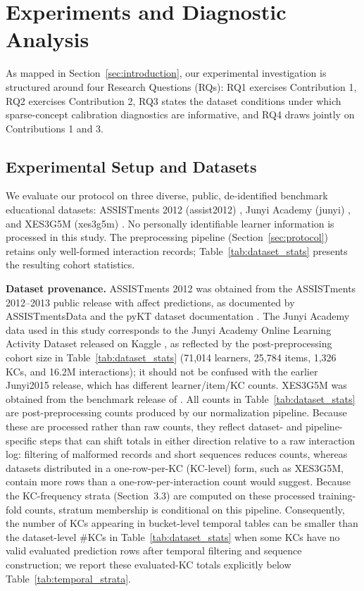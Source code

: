 \section{Experiments and Diagnostic Analysis}
\label{sec:experiments}

As mapped in Section~\ref{sec:introduction}, our experimental investigation is structured around four Research Questions (RQs): RQ1 exercises Contribution 1, RQ2 exercises Contribution 2, RQ3 states the dataset conditions under which sparse-concept calibration diagnostics are informative, and RQ4 draws jointly on Contributions 1 and 3.

\subsection{Experimental Setup and Datasets}
We evaluate our protocol on three diverse, public, de-identified benchmark educational datasets: ASSISTments 2012 (assist2012) \citep{assistments2012data,liu2022pykt}, Junyi Academy (junyi) \citep{junyi2019kaggle}, and XES3G5M (xes3g5m) \citep{liu2023xes3g5m}. No personally identifiable learner information is processed in this study. The preprocessing pipeline (Section~\ref{sec:protocol}) retains only well-formed interaction records; Table~\ref{tab:dataset_stats} presents the resulting cohort statistics.

\textbf{Dataset provenance.} ASSISTments 2012 was obtained from the ASSISTments 2012--2013 public release with affect predictions, as documented by ASSISTmentsData and the pyKT dataset documentation \citep{assistments2012data, liu2022pykt}. The Junyi Academy data used in this study corresponds to the Junyi Academy Online Learning Activity Dataset released on Kaggle \citep{junyi2019kaggle}, as reflected by the post-preprocessing cohort size in Table~\ref{tab:dataset_stats} (71,014 learners, 25,784 items, 1,326 KCs, and 16.2M interactions); it should not be confused with the earlier Junyi2015 release, which has different learner/item/KC counts. XES3G5M was obtained from the benchmark release of \citet{liu2023xes3g5m}. All counts in Table~\ref{tab:dataset_stats} are post-preprocessing counts produced by our normalization pipeline. Because these are processed rather than raw counts, they reflect dataset- and pipeline-specific steps that can shift totals in either direction relative to a raw interaction log: filtering of malformed records and short sequences reduces counts, whereas datasets distributed in a one-row-per-KC (KC-level) form, such as XES3G5M, contain more rows than a one-row-per-interaction count would suggest. Because the KC-frequency strata (Section~3.3) are computed on these processed training-fold counts, stratum membership is conditional on this pipeline. Consequently, the number of KCs appearing in bucket-level temporal tables can be smaller than the dataset-level \#KCs in Table~\ref{tab:dataset_stats} when some KCs have no valid evaluated prediction rows after temporal filtering and sequence construction; we report these evaluated-KC totals explicitly below Table~\ref{tab:temporal_strata}.

